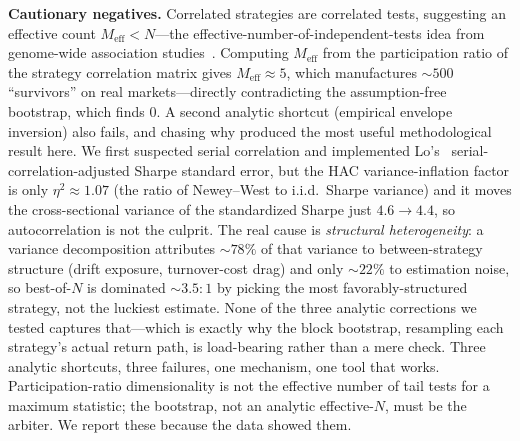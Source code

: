 \documentclass[sigconf]{acmart}
\begin{document}
\textbf{Cautionary negatives.} Correlated strategies are correlated tests, suggesting an effective count $M_{\text{eff}}<N$---the effective-number-of-independent-tests idea from genome-wide association studies~\cite{nyholt2004,galwey2009}. Computing $M_{\text{eff}}$ from the participation ratio of the strategy correlation matrix gives $M_{\text{eff}}{\approx}5$, which manufactures ${\sim}500$ ``survivors'' on real markets---directly contradicting the assumption-free bootstrap, which finds $0$. A second analytic shortcut (empirical envelope inversion) also fails, and chasing why produced the most useful methodological result here. We first suspected serial correlation and implemented Lo's~\cite{lo2002} serial-correlation-adjusted Sharpe standard error, but the HAC variance-inflation factor is only $\eta^2{\approx}1.07$ (the ratio of Newey--West to i.i.d.\ Sharpe variance) and it moves the cross-sectional variance of the standardized Sharpe just $4.6\to4.4$, so autocorrelation is not the culprit. The real cause is \emph{structural heterogeneity}: a variance decomposition attributes ${\sim}78\%$ of that variance to between-strategy structure (drift exposure, turnover-cost drag) and only ${\sim}22\%$ to estimation noise, so best-of-$N$ is dominated ${\sim}3.5{:}1$ by picking the most favorably-structured strategy, not the luckiest estimate. None of the three analytic corrections we tested captures that---which is exactly why the block bootstrap, resampling each strategy's actual return path, is load-bearing rather than a mere check. Three analytic shortcuts, three failures, one mechanism, one tool that works. Participation-ratio dimensionality is not the effective number of tail tests for a maximum statistic; the bootstrap, not an analytic effective-$N$, must be the arbiter. We report these because the data showed them.
\end{document}
